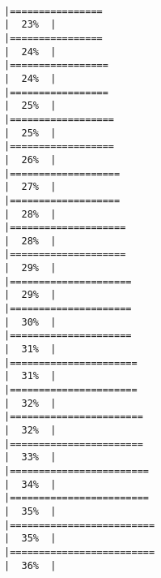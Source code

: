 \documentclass[12pt,twoside]{reedthesis}
\begin{document}
\begin{verbatim}
                                                                           |================                                                      |  23%  |                                                                              |================                                                      |  24%  |                                                                              |=================                                                     |  24%  |                                                                              |=================                                                     |  25%  |                                                                              |==================                                                    |  25%  |                                                                              |==================                                                    |  26%  |                                                                              |===================                                                   |  27%  |                                                                              |===================                                                   |  28%  |                                                                              |====================                                                  |  28%  |                                                                              |====================                                                  |  29%  |                                                                              |=====================                                                 |  29%  |                                                                              |=====================                                                 |  30%  |                                                                              |=====================                                                 |  31%  |                                                                              |======================                                                |  31%  |                                                                              |======================                                                |  32%  |                                                                              |=======================                                               |  32%  |                                                                              |=======================                                               |  33%  |                                                                              |========================                                              |  34%  |                                                                              |========================                                              |  35%  |                                                                              |=========================                                             |  35%  |                                                                              |=========================                                             |  36%  |    
\end{verbatim}
\end{document}
